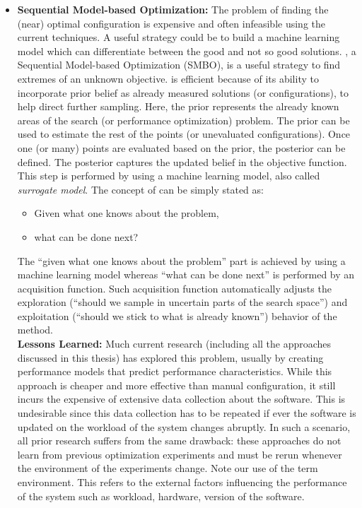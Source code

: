 \begin{itemize}
    \item \textbf{Sequential Model-based Optimization:}  The problem of finding the (near) optimal configuration is expensive and often infeasible using the current techniques. A useful strategy could be to build a machine learning model which can differentiate between the good and not so good solutions. \flash, a Sequential Model-based Optimization (SMBO), is a useful strategy to find extremes of an unknown objective. \flash is efficient because of its ability to incorporate prior belief as already measured solutions (or configurations), to help direct further sampling. Here, the prior represents the already known areas of the search (or performance optimization) problem. The prior can be used to estimate the rest of the points (or unevaluated configurations). Once one (or many) points are evaluated based on the prior, the posterior can be defined. The posterior captures the updated belief in the objective function. This step is performed by using a machine learning model, also called \textit{surrogate model}. The concept of \flash can be simply stated as:
    \begin{itemize}
        \item Given what one knows about the problem,
        \item what can be done next?
    \end{itemize}
    The ``given what one knows about the problem'' part is achieved by using a machine learning model whereas ``what can be done next'' is performed by an acquisition function. Such acquisition function automatically adjusts the exploration (``should we sample in uncertain parts of the search space'') and exploitation (``should we stick to what is already known'') behavior of the method.\\
    \noindent\textbf{Lessons Learned: } Much current research (including all the approaches discussed in this thesis) has explored this problem, usually by creating performance models that predict performance characteristics. While this approach is cheaper and more effective than manual configuration, it still incurs the expensive of extensive data collection about the software. This is undesirable since this data collection has to be repeated if ever the software is updated on the workload of the system changes abruptly. In such a scenario, all prior research suffers from the same drawback: these approaches do not learn from previous optimization experiments and must be rerun whenever the environment of the experiments change. Note our use of the term environment. This refers to the external factors influencing the performance of the system such as workload, hardware, version of the software.
    
\end{itemize}


